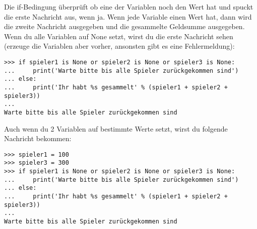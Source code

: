 Die if-Bedingung überprüft ob eine der Variablen noch den Wert  hat und spuckt die erste Nachricht aus, wenn ja. Wenn jede Variable einen Wert hat, dann wird die zweite Nachricht ausgegeben und die gesammelte Geldsumme ausgegeben. Wenn du alle Variablen auf None setzt, wirst du die erste Nachricht sehen (erzeuge die Variablen aber vorher, ansonsten gibt es eine Fehlermeldung):

\begin{listing}
\begin{verbatim}
>>> if spieler1 is None or spieler2 is None or spieler3 is None:
...     print('Warte bitte bis alle Spieler zurückgekommen sind')
... else:
...     print('Ihr habt %s gesammelt' % (spieler1 + spieler2 + spieler3))
...
Warte bitte bis alle Spieler zurückgekommen sind
\end{verbatim}
\end{listing}

Auch wenn du 2 Variablen auf bestimmte Werte setzt, wirst du folgende Nachricht bekommen:

\begin{listing}
\begin{verbatim}
>>> spieler1 = 100
>>> spieler3 = 300
>>> if spieler1 is None or spieler2 is None or spieler3 is None:
...     print('Warte bitte bis alle Spieler zurückgekommen sind')
... else:
...     print('Ihr habt %s gesammelt' % (spieler1 + spieler2 + spieler3))
...
Warte bitte bis alle Spieler zurückgekommen sind
\end{verbatim}
\end{listing}

